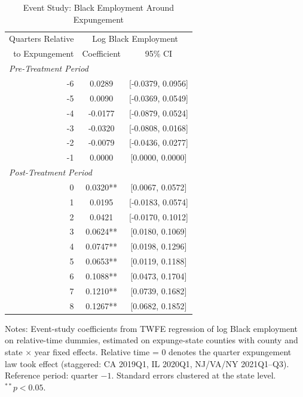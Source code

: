 \begin{table}[h!]
\centering
\caption{Event Study: Black Employment Around Expungement}
\label{tab:eventstudy}
\begin{tabular}{rcc}
\toprule
Quarters Relative & \multicolumn{2}{c}{Log Black Employment} \\
to Expungement & Coefficient & 95\% CI \\
\midrule
\multicolumn{3}{l}{\textit{Pre-Treatment Period}} \\
-6 & 0.0289 & [-0.0379, 0.0956] \\
-5 & 0.0090 & [-0.0369, 0.0549] \\
-4 & -0.0177 & [-0.0879, 0.0524] \\
-3 & -0.0320 & [-0.0808, 0.0168] \\
-2 & -0.0079 & [-0.0436, 0.0277] \\
-1 & 0.0000 & [0.0000, 0.0000] \\
\midrule
\multicolumn{3}{l}{\textit{Post-Treatment Period}} \\
0 & 0.0320** & [0.0067, 0.0572] \\
1 & 0.0195 & [-0.0183, 0.0574] \\
2 & 0.0421 & [-0.0170, 0.1012] \\
3 & 0.0624** & [0.0180, 0.1069] \\
4 & 0.0747** & [0.0198, 0.1296] \\
5 & 0.0653** & [0.0119, 0.1188] \\
6 & 0.1088** & [0.0473, 0.1704] \\
7 & 0.1210** & [0.0739, 0.1682] \\
8 & 0.1267** & [0.0682, 0.1852] \\
\bottomrule
\end{tabular}
\begin{tablenotes}
\small
\item Notes: Event-study coefficients from TWFE regression of log Black employment on relative-time dummies, estimated on expunge-state counties with county and state $\times$ year fixed effects. Relative time = 0 denotes the quarter expungement law took effect (staggered: CA 2019Q1, IL 2020Q1, NJ/VA/NY 2021Q1--Q3). Reference period: quarter $-1$. Standard errors clustered at the state level. $^{**}p<0.05$.
\end{tablenotes}
\end{table}

